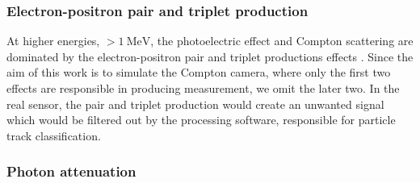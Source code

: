 \documentclass[a4paper,11pt,titlepage,twoside]{article}
\newcommand{\unit}[2]{$#1~\ensuremath{\mathrm{#2}}$}
\begin{document}

\subsubsection*{Electron-positron pair and triplet production}


At higher energies, \unit{>1}{MeV}, the photoelectric effect and Compton scattering are dominated by the electron-positron pair and triplet productions effects \cite{hubbell1980pair}.
Since the aim of this work is to simulate the Compton camera, where only the first two effects are responsible in producing measurement, we omit the later two.
In the real sensor, the pair and triplet production would create an unwanted signal which would be filtered out by the processing software, responsible for particle track classification.


\subsubsection*{Photon attenuation}

\end{document}
